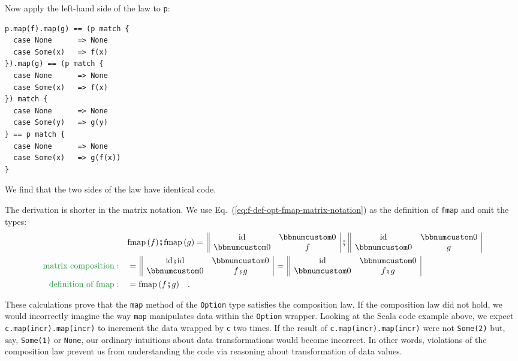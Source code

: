 Now apply the left-hand side of the law to \lstinline!p!:
\begin{lstlisting}
p.map(f).map(g) == (p match {
  case None      => None
  case Some(x)   => f(x)
}).map(g) == (p match {
  case None      => None
  case Some(x)   => f(x)
}) match {
  case None      => None
  case Some(y)   => g(y)
} == p match {
  case None      => None
  case Some(x)   => g(f(x))
}
\end{lstlisting}
We find that the two sides of the law have identical code.

The derivation is shorter in the matrix notation. We use Eq.~(\ref{eq:f-def-opt-fmap-matrix-notation})
as the definition of \lstinline!fmap! and omit the types:
\begin{align*}
 & \text{fmap}\,(f)\bef\text{fmap}\,(g)=\,\begin{array}{||cc|}
\text{id} & \bbnum 0\\
\bbnum 0 & f
\end{array}\,\bef\,\begin{array}{||cc|}
\text{id} & \bbnum 0\\
\bbnum 0 & g
\end{array}\\
{\color{greenunder}\text{matrix composition}:}\quad & =\,\begin{array}{||cc|}
\text{id}\bef\text{id} & \bbnum 0\\
\bbnum 0 & f\bef g
\end{array}\,=\,\begin{array}{||cc|}
\text{id} & \bbnum 0\\
\bbnum 0 & f\bef g
\end{array}\\
{\color{greenunder}\text{definition of fmap}:}\quad & =\text{fmap}\,(f\bef g)\quad.
\end{align*}

These calculations prove that the \lstinline!map! method of the \lstinline!Option!
type satisfies the composition law. If the composition law did not
hold, we would incorrectly imagine the way \lstinline!map! manipulates
data within the \lstinline!Option! wrapper. Looking at the Scala
code example above, we expect \lstinline!c.map(incr).map(incr)! to
increment the data wrapped by \lstinline!c! two times. If the result
of \lstinline!c.map(incr).map(incr)! were not \lstinline!Some(2)!
but, say, \lstinline!Some(1)! or \lstinline!None!, our ordinary
intuitions about data transformations would become incorrect. In other
words, violations of the composition law prevent us from understanding
the code via reasoning about transformation of data values.

